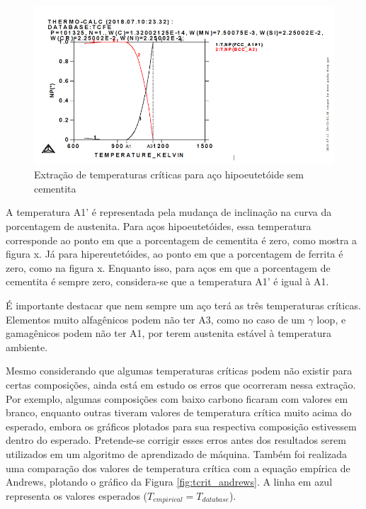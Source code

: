 \documentclass[brazil,tese,epusp]{usp}
\begin{document}
\begin{figure}
  \includegraphics[width=.9\textwidth]{img/418editado.png}
  \caption{Extração de temperaturas críticas para aço hipoeutetóide sem cementita}
  \label{fig:Tcrit_liga_sem_cementita}
\end{figure}

A temperatura A1' é representada pela mudança de inclinação na curva da porcentagem de austenita. Para aços hipoeutetóides, essa temperatura corresponde ao ponto em que a porcentagem de cementita é zero, como mostra a figura x. Já para hipereutetóides, ao ponto em que a porcentagem de ferrita é zero, como na figura x. Enquanto isso, para aços em que a porcentagem de cementita é sempre zero, considera-se que a temperatura A1' é igual à A1.

É importante destacar que nem sempre um aço terá as três temperaturas críticas. Elementos muito alfagênicos podem não ter A3, como no caso de um $\gamma$ loop, e gamagênicos podem não ter A1, por terem austenita estável à temperatura ambiente.

Mesmo considerando que algumas temperaturas críticas podem não existir para certas composições, ainda está em estudo os erros que ocorreram nessa extração. Por exemplo, algumas composições com baixo carbono ficaram com valores em branco, enquanto outras tiveram valores de temperatura crítica muito acima do esperado, embora os gráficos plotados para sua respectiva composição estivessem dentro do esperado. Pretende-se corrigir esses erros antes dos resultados serem utilizados em um algoritmo de aprendizado de máquina.
Também foi realizada uma comparação dos valores de temperatura crítica com a equação empírica de Andrews, plotando o gráfico da Figura \ref{fig:tcrit_andrews}. A linha em azul representa os valores esperados ($T_{empirical} = T_{database}$).
\end{document}
